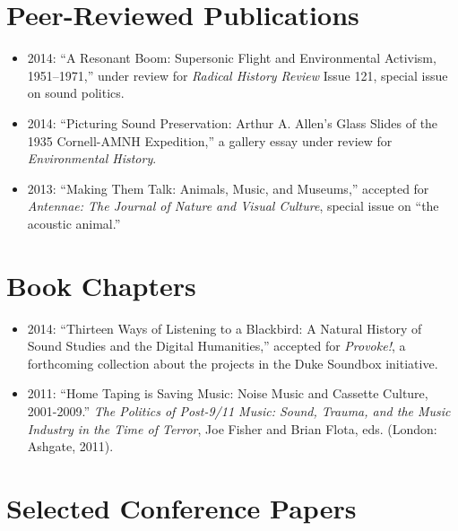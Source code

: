 \documentclass[11pt, a4paper]{article}
\begin{document}
\section{Peer-Reviewed Publications}

\begin{itemize}
\itemsep1pt\parskip0pt
\item
  2014: ``A Resonant Boom: Supersonic Flight and Environmental Activism,
  1951--1971,'' under review for \emph{Radical History Review} Issue
  121, special issue on sound politics.
\item
  2014: ``Picturing Sound Preservation: Arthur A. Allen's Glass Slides
  of the 1935 Cornell-AMNH Expedition,'' a gallery essay under review
  for \emph{Environmental History}.
\item
  2013: ``Making Them Talk: Animals, Music, and Museums,'' accepted for
  \emph{Antennae: The Journal of Nature and Visual Culture}, special
  issue on ``the acoustic animal.''
\end{itemize}

\section{Book Chapters}

\begin{itemize}
\itemsep1pt\parskip0pt
\item
  2014: ``Thirteen Ways of Listening to a Blackbird: A Natural History
  of Sound Studies and the Digital Humanities,'' accepted for
  \emph{Provoke!}, a forthcoming collection about the projects in the
  Duke Soundbox initiative.
\item
  2011: ``Home Taping is Saving Music: Noise Music and Cassette Culture,
  2001-2009.'' \emph{The Politics of Post-9/11 Music: Sound, Trauma, and
  the Music Industry in the Time of Terror}, Joe Fisher and Brian Flota,
  eds. (London: Ashgate, 2011).
\end{itemize}

\section{Selected Conference Papers}
\end{document}
